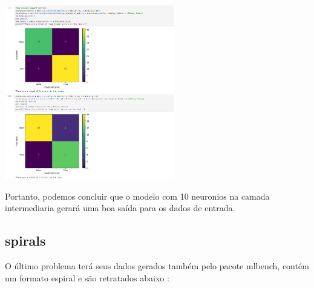 \documentclass{article}
\begin{document}
\begin{center}

\includegraphics[height=3in]{exercise_pic/circle/conf_matrix_30.png}
\vspace{10pt} 

Portanto, podemos concluir que o modelo com 10 neuronios na camada intermediaria gerará uma boa saída para os dados de entrada.

\end{center}





























\subsection{spirals}


O último problema terá seus dados gerados também pelo pacote mlbench, contém um formato espiral e são retratados abaixo : 
\end{document}
